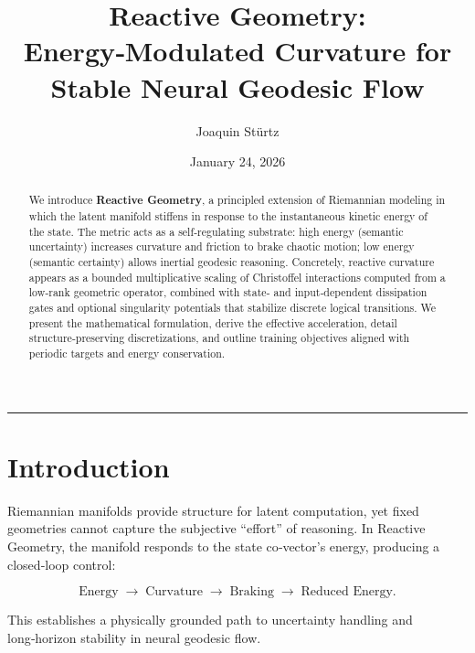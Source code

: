 \documentclass[12pt,letterpaper,twoside]{article}
\title{\textbf{Reactive Geometry: Energy‑Modulated Curvature for Stable Neural Geodesic Flow}}
\author{Joaquin Stürtz}
\date{January 24, 2026}
\begin{document}
\maketitle
\thispagestyle{empty}

\vspace{0.5cm}

\begin{abstract}
We introduce \textbf{Reactive Geometry}, a principled extension of Riemannian modeling in which the latent manifold stiffens in response to the instantaneous kinetic energy of the state. The metric acts as a self‑regulating substrate: high energy (semantic uncertainty) increases curvature and friction to brake chaotic motion; low energy (semantic certainty) allows inertial geodesic reasoning. Concretely, reactive curvature appears as a bounded multiplicative scaling of Christoffel interactions computed from a low‑rank geometric operator, combined with state‑ and input‑dependent dissipation gates and optional singularity potentials that stabilize discrete logical transitions. We present the mathematical formulation, derive the effective acceleration, detail structure‑preserving discretizations, and outline training objectives aligned with periodic targets and energy conservation.
\end{abstract}

\vspace{0.5cm}
\hrule
\vspace{0.5cm}

\tableofcontents
\newpage

\section{Introduction}

Riemannian manifolds provide structure for latent computation, yet fixed geometries cannot capture the subjective ``effort'' of reasoning. In Reactive Geometry, the manifold responds to the state co‑vector's energy, producing a closed‑loop control:

\[
\text{Energy} \;\longrightarrow\; \text{Curvature} \;\longrightarrow\; \text{Braking} \;\longrightarrow\; \text{Reduced Energy}.
\]

This establishes a physically grounded path to uncertainty handling and long‑horizon stability in neural geodesic flow.
\end{document}
